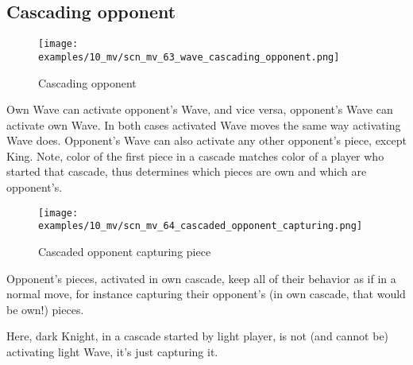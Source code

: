 \clearpage %

\subsection*{Cascading opponent}
\label{sec:Miranda's veil/Wave/Cascading opponent}

\vspace*{-1.4\baselineskip}
\noindent
\begin{figure}[h]
\texttt{[image: examples/10\_mv/scn\_mv\_63\_wave\_cascading\_opponent.png]}
\caption{Cascading opponent}
\label{fig:scn_mv_63_wave_cascading_opponent}
\end{figure}

Own Wave can activate opponent's Wave, and vice versa, opponent's Wave can activate
own Wave. In both cases activated Wave moves the same way activating Wave does.
Opponent's Wave can also activate any other opponent's piece, except King. Note,
color of the first piece in a cascade matches color of a player who started that
cascade, thus determines which pieces are own and which are opponent's.


\clearpage %

\vspace*{-2.1\baselineskip}
\noindent
\begin{figure}[h]
\texttt{[image: examples/10\_mv/scn\_mv\_64\_cascaded\_opponent\_capturing.png]}
\caption{Cascaded opponent capturing piece}
\label{fig:scn_mv_64_cascaded_opponent_capturing}
\end{figure}

Opponent's pieces, activated in own cascade, keep all of their behavior as if in a
normal move, for instance capturing their opponent's (in own cascade, that would be
own!) pieces.

Here, dark Knight, in a cascade started by light player, is not (and cannot be)
activating light Wave, it's just capturing it.


